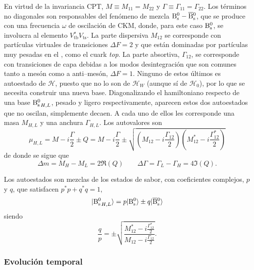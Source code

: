 En virtud de la invariancia CPT, $M \equiv M_{11} = M_{22}$ y $\Gamma \equiv \Gamma_{11}=\Gamma_{22}$. Los términos no diagonales son responsables del fenómeno de mezcla $\text{B}{}_{\text{s}}^{\text{0}} - \overline{\text{B}}{}_{\text{s}}^{\text{0}}$, que se produce con una frecuencia $\omega$ de oscilación de CKM, donde, para este caso $\text{B}{}_{\text{s}}^{\text{0}}$, se involucra al elemento $ V{}_{\text{tb}}^* V{}_{\text{ts}}$. La parte dispersiva $M_{12}$ se corresponde con partículas virtuales de transiciones $\Delta F = 2$ y que están dominadas por partículas muy pesadas en el \stdmod, como el cuark \textit{top}. La parte absortiva, $\Gamma_{12}$, se corresponde con transiciones de capa debidas a los modos desintegración que son comunes tanto a mesón como a anti--mesón, $\Delta F = 1$. Ninguno de estos últimos es autoestado de $\mathcal{H}$, puesto que no lo son de $\mathcal{H}_W$ (aunque sí de $\mathcal{H}_0$), por lo que se necesita construir una nueva base. Diagonalizando el hamiltoniano respecto de una base ${\text{B}{}_{\text{s}}^{\text{0}}}_{H,L}$, pesado y ligero respectivamente, aparecen estos dos autoestados que no oscilan, simplemente decaen. A cada uno de ellos les corresponde una masa $M_{H,L}$ y una anchura $\Gamma_{H,L}$. Los autovalores son
%
\[\mu_{H,L} = M - i\frac{\Gamma}{2} \pm Q = M - i\frac{\Gamma}{2} \pm \sqrt{\left(M_{12}-i\frac{\Gamma_{12}}{2}\right) \left(M_{12}^*-i\frac{\Gamma_{12}^*}{2}\right)}\]
de donde se sigue que 
\[\Delta m = M_H - M_L =2 \Re (Q) \qquad \Delta \Gamma = \Gamma_L - \Gamma_H = 4 \Im (Q).\]
 
Los autoestados son mezclas de los estados de sabor, con coeficientes complejos, $p$ y $q$, que satisfacen $p^*p + q^*q = 1$,
%
\[| {\text{B}{}_{\text{s}}^{\text{0}}}_{H,L} \rangle = p |\text{B}{}_{\text{s}}^{\text{0}} \rangle \pm q | \overline{\text{B}}{}_{\text{s}}^{\text{0}} \rangle \]
%
siendo 
\begin{equation}
\frac{q}{p}  = \pm \sqrt{\frac {M_{12}^*-i\frac{\Gamma_{12}^*}{2}} {M_{12}-i\frac{\Gamma_{12}}{2}} }	.\label{eq_qp_cocient}
\end{equation}



\subsubsection{Evolución temporal} %
\label{sec_evotempB}

